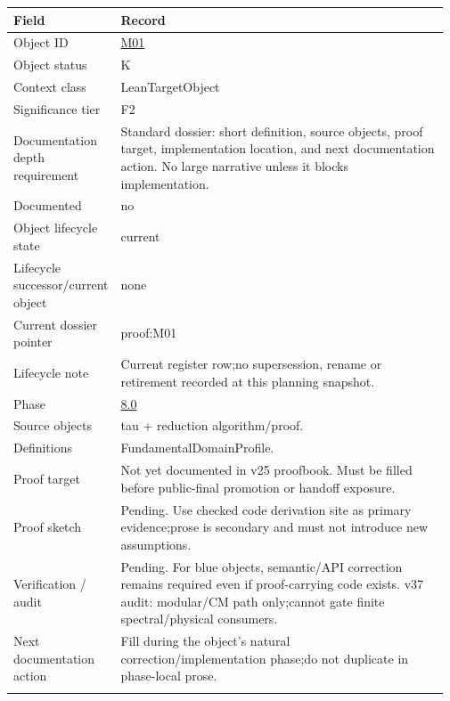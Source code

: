 \begin{longtable}{L{0.16\linewidth} L{0.81\linewidth}}
\hline
\textbf{Field} & \textbf{Record}\\
\hline
Object ID & \hyperlink{object-row-M01}{M01}\\
\hline\addlinespace[0.20em]
Object status & K\\
\hline\addlinespace[0.20em]
Context class & LeanTargetObject\\
\hline\addlinespace[0.20em]
Significance tier & F2\\
\hline\addlinespace[0.20em]
Documentation depth requirement & Standard dossier: short definition, source objects, proof target, implementation location, and next documentation action. No large narrative unless it blocks implementation.\\
\hline\addlinespace[0.20em]
Documented & no\\
\hline\addlinespace[0.20em]
Object lifecycle state & current\\
\hline\addlinespace[0.20em]
Lifecycle successor/\allowbreak{}current object & none\\
\hline\addlinespace[0.20em]
Current dossier pointer & proof:M01\\
\hline\addlinespace[0.20em]
Lifecycle note & Current register row;\newline no supersession, rename or retirement recorded at this planning snapshot.\\
\hline\addlinespace[0.20em]
Phase & \hyperlink{phase-row-8-0}{8.0}\\
\hline\addlinespace[0.20em]
Source objects & tau + reduction algorithm/\allowbreak{}proof.\\
\hline\addlinespace[0.20em]
Definitions & FundamentalDomainProfile.\\
\hline\addlinespace[0.20em]
Proof target & Not yet documented in v25 proofbook. Must be filled before public-final promotion or handoff exposure.\\
\hline\addlinespace[0.20em]
Proof sketch & Pending. Use checked code derivation site as primary evidence;\newline prose is secondary and must not introduce new assumptions.\\
\hline\addlinespace[0.20em]
Verification /\allowbreak{} audit & Pending. For blue objects, semantic/\allowbreak{}API correction remains required even if proof-carrying code exists. v37 audit: modular/\allowbreak{}CM path only;\newline cannot gate finite spectral/\allowbreak{}physical consumers.\\
\hline\addlinespace[0.20em]
Next documentation action & Fill during the object's natural correction/\allowbreak{}implementation phase;\newline do not duplicate in phase-local prose.\\
\hline\addlinespace[0.20em]
\end{longtable}
